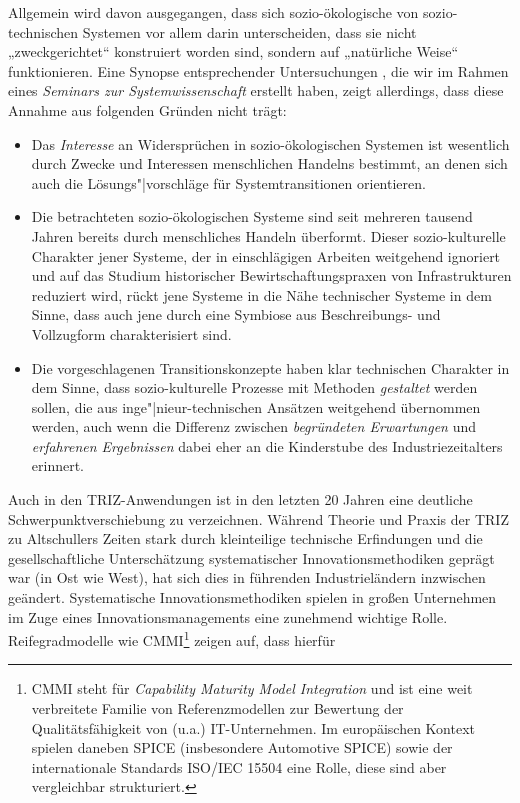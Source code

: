 \documentclass[12pt,a4paper]{article}
\begin{document}
Allgemein wird davon ausgegangen, dass sich sozio-ökologische von
sozio-technischen Systemen vor allem darin unterscheiden, dass sie nicht
„zweckgerichtet“ konstruiert worden sind, sondern auf „natürliche Weise“
funktionieren.  Eine Synopse entsprechender Untersuchungen \cite{Graebe2020a},
die wir im Rahmen eines \emph{Seminars zur Systemwissenschaft} erstellt haben,
zeigt allerdings, dass diese Annahme aus folgenden Gründen nicht trägt:
\begin{itemize}
\item[1.] Das \emph{Interesse} an Widersprüchen in sozio-ökologischen Systemen
  ist wesentlich durch Zwecke und Interessen menschlichen Handelns bestimmt,
  an denen sich auch die Lösungs"|vorschläge für Systemtransitionen
  orientieren.
\item[2.] Die betrachteten sozio-ökologischen Systeme sind seit mehreren
  tausend Jahren bereits durch menschliches Handeln überformt. Dieser
  sozio-kulturelle Charakter jener Systeme, der in einschlägigen Arbeiten
  weitgehend ignoriert und auf das Studium historischer Bewirtschaftungspraxen
  von Infrastrukturen reduziert wird, rückt jene Systeme in die Nähe
  technischer Systeme in dem Sinne, dass auch jene durch eine Symbiose aus
  Beschreibungs- und Vollzugform charakterisiert sind.
\item[3.] Die vorgeschlagenen Transitionskonzepte haben klar technischen
  Charakter in dem Sinne, dass sozio-kulturelle Prozesse mit Methoden
  \emph{gestaltet} werden sollen, die aus inge"|nieur-technischen Ansätzen
  weitgehend übernommen werden, auch wenn die Differenz zwischen
  \emph{begründeten Erwartungen} und \emph{erfahrenen Ergebnissen} dabei eher
  an die Kinderstube des Industriezeitalters erinnert. 
\end{itemize}
\enlargethispage{1em}
Auch in den TRIZ-Anwendungen ist in den letzten 20 Jahren eine deutliche
Schwerpunktverschiebung zu verzeichnen. Während Theorie und Praxis der TRIZ zu
Altschullers Zeiten stark durch kleinteilige technische Erfindungen und die
gesellschaftliche Unterschätzung systematischer Innovationsmethodiken geprägt
war (in Ost wie West), hat sich dies in führenden Industrieländern inzwischen
geändert. Systematische Innovationsmethodiken spielen in großen Unternehmen im
Zuge eines Innovationsmanagements eine zunehmend wichtige Rolle.
Reifegradmodelle wie CMMI\footnote{CMMI steht für \emph{Capability Maturity
    Model Integration} und ist eine weit verbreitete Familie von
  Referenzmodellen zur Bewertung der Qualitätsfähigkeit von (u.a.)
  IT-Unternehmen. Im europäischen Kontext spielen daneben SPICE (insbesondere
  Automotive SPICE) sowie der internationale Standards ISO/IEC 15504 eine
  Rolle, diese sind aber vergleichbar strukturiert.} zeigen auf, dass hierfür
\end{document}
